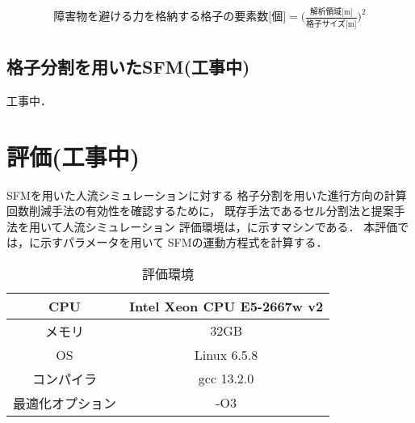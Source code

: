 

\begin{eqnarray}
 \mbox{障害物を避ける力を格納する格子の要素数[個]} =  \Big( \frac{\mbox{解析領域[m]}}{\mbox{格子サイズ[m]}} \Big) ^ 2
 \label{eq:fiw_youso_size}
\end{eqnarray}

\subsection{格子分割を用いたSFM(工事中)}
工事中．

\section{評価(工事中)}
SFMを用いた人流シミュレーションに対する
格子分割を用いた進行方向の計算回数削減手法の有効性を確認するために，
既存手法であるセル分割法と提案手法を用いて人流シミュレーション
評価環境は，に示すマシンである．
本評価では，に示すパラメータを用いて
SFMの運動方程式を計算する．


\begin{table}[tb]
  \begin{center}
    \caption{評価環境}
      \label{tb:result_env}
      \begin{tabular}{c|c}
      \hline \hline
      CPU              & Intel Xeon CPU E5-2667w v2 \\ \hline
      メモリ           & 32GB                       \\ \hline
      OS               & Linux 6.5.8               \\ \hline
      コンパイラ       & gcc 13.2.0                  \\ \hline
      最適化オプション & -O3                        \\ \hline
    \end{tabular}
  \end{center}
\end{table}


